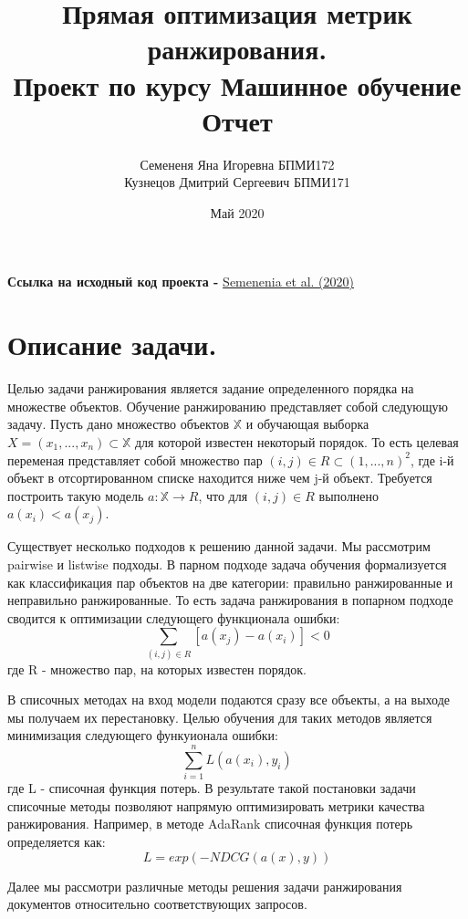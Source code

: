 \documentclass{article}[16pt]
\title{Прямая оптимизация метрик ранжирования. \\Проект по курсу Машинное обучение \\Отчет}
\author{Семененя Яна Игоревна БПМИ172 \\ Кузнецов Дмитрий Сергеевич БПМИ171}
\date{Май 2020}
\newcommand{\bibref}[3]{\hyperlink{#1}{#2 (#3)}}
\begin{document}
\maketitle

\newpage
\textbf{Ссылка на исходный код проекта -} \bibref{source}{Semenenia et al.}{2020}

\section{Описание задачи.}

Целью задачи ранжирования является задание определенного порядка на множестве объектов.  Обучение ранжированию представляет собой следующую задачу. Пусть дано множество объектов $\mathbb{X}$ и обучающая выборка $X = (x_1,...,x_n) \subset \mathbb{X}$ для которой известен некоторый порядок. То есть целевая переменая представляет собой множество пар $(i, j) \in R \subset (1, ..., n)^2$, где i-й объект в отсортированном списке находится ниже чем j-й объект.
Требуется построить такую модель $a: \mathbb{X} \to R$, что для $(i, j) \in R$ выполнено $a(x_i) < a(x_j)$.

Существует несколько подходов к решению данной задачи. Мы рассмотрим pairwise и listwise подходы. В парном подходе задача обучения формализуется как классификация пар объектов на две категории: правильно ранжированные и неправильно ранжированные.
То есть задача ранжирования в попарном подходе сводится к оптимизации следующего функционала ошибки:
$$\sum\limits_{(i,j) \in R} [a(x_j) - a(x_i)] < 0$$ 
где R - множество пар, на которых известен порядок. 

В списочных методах на вход модели подаются сразу все объекты, а на выходе мы получаем их перестановку. Целью обучения для таких методов является минимизация следующего функуионала ошибки:
$$\sum\limits_{i=1}^n L(a(x_i), y_i)$$
где L - списочная функция потерь. В результате такой постановки задачи списочные методы позволяют напрямую оптимизировать метрики качества ранжирования. Например, в методе AdaRank списочная функция потерь определяется как:
$$L = exp(-NDCG(a(x), y))$$


Далее мы рассмотри различные методы решения задачи ранжирования документов относительно соответствующих запросов.
\end{document}
